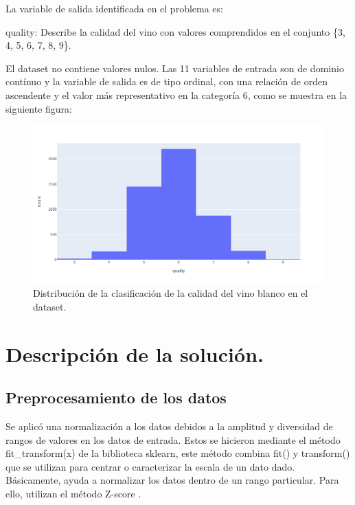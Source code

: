\documentclass[runningheads]{llncs}
\begin{document}
La variable de salida identificada en el problema es:

quality: Describe la calidad del vino con valores comprendidos en el conjunto \{3, 4, 5, 6, 7, 8, 9\}.

El dataset no contiene valores nulos. Las 11 variables de entrada son de dominio cont{\'i}nuo y la variable de salida es de tipo ordinal, con una relaci{\'o}n de orden ascendente y el valor m{\'a}s representativo en la categor{\'i}a 6, como se muestra en la siguiente figura:

\begin{figure}
	\begin{center}
		\includegraphics[width=1\textwidth]{images/newplot.png}
		\caption{Distribuci{\'o}n de la clasificaci{\'o}n de la calidad del vino blanco en el dataset.} \label{matrix}
	\end{center}
\end{figure}

\section{Descripci{\'o}n de la soluci{\'o}n.}

\subsection{Preprocesamiento de los datos}
Se aplic{\'o} una normalizaci{\'o}n a los datos debidos a la amplitud y diversidad de rangos de valores en los datos de entrada. Estos se hicieron mediante el m{\'e}todo fit\_transform(x) de la biblioteca sklearn, este m{\'e}todo combina fit() y transform() que se utilizan para centrar o caracterizar la escala de un dato dado. B{\'a}sicamente, ayuda a normalizar los datos dentro de un rango particular. Para ello, utilizan el m{\'e}todo Z-score \cite{raschka2015python}⁠.
\end{document}

